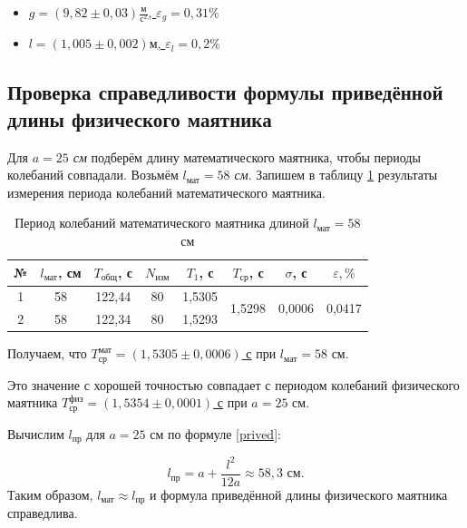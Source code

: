\documentclass[a4paper,12pt]{article} %
\begin{document}
\begin{itemize}
	\item \underline{$ g = \left( 9,82\pm0,03\right) \frac{\text{м}}{\text{с}^2} $, $ \varepsilon_g=0,31\% $}
	\item \underline{$ l = \left( 1,005\pm0,002\right) \text{м} $, $ \varepsilon_l=0,2\% $}
\end{itemize}

\subsection{Проверка справедливости формулы приведённой длины физического маятника}

Для \textit{$ a = 25 $ см} подберём длину математического маятника, чтобы периоды колебаний совпадали. Возьмём \textit{$ l_\text{мат} = 58 $ см}. Запишем в таблицу \ref{tab_mat} результаты измерения периода колебаний математического маятника.


\begin{table}[h!]
	\begin{center}
		\begin{tabular}{|c|c|c|c|c|c|c|c|}
		\hline
		№ & $ l_\text{мат} $, см & $ T_\text{общ} $, с & $ N_\text{изм} $ & $ T_1 $, с   & $ T_\text{ср} $, с                     & $ \sigma $, с                     & $ \varepsilon, \% $                     \\ \hline
		1 & 58       & 122,44    & 80         & 1,5305 & \multirow{2}{*}{1,5298} & \multirow{2}{*}{0,0006} & \multirow{2}{*}{0,0417} \\ \cline{1-5}
		2 & 58       & 122,34    & 80         & 1,5293 &                         &                         &                         \\ \hline
	\end{tabular}
	\end{center}
\caption{Период колебаний математического маятника длиной $ l_\text{мат} = 58 $ см}
\label{tab_mat}
\end{table}

Получаем, что \underline{$ T_\text{ср}^\text{мат} = \left( 1,5305\pm0,0006 \right)  $ с} при $ l_\text{мат}=58 $ см.

Это значение с хорошей точностью совпадает с периодом колебаний физического маятника \underline{$ T_\text{ср}^\text{физ} = \left( 1,5354\pm0,0001 \right)  $ с} при $ a = 25 $ см.

Вычислим $ l_\text{пр} $ для $ a = 25 $ см по формуле \eqref{prived}:

\begin{equation}
l_\text{пр}=a+\frac{l^2}{12a}\approx 58,3 \text{ см}.
\end{equation}
Таким образом, $ l_\text{мат}\approx l_\text{пр} $ и формула приведённой длины физического маятника справедлива.
\end{document}
